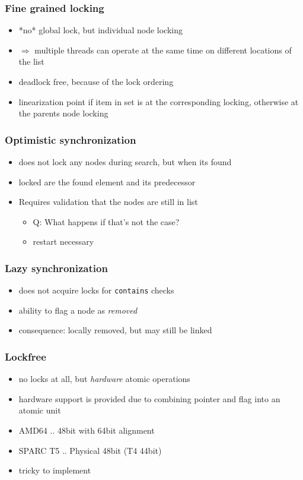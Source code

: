 \begin{frame}
\frametitle{Fine grained locking}
\begin{itemize}
	\item *no* global lock, but individual node locking
    \item \(\Rightarrow\) multiple threads can operate at the same time on different locations of the list
    \item deadlock free, because of the lock ordering
    \item linearization point if item in set is at the corresponding locking, otherwise at the parents node locking
\end{itemize}
\end{frame}

\begin{frame}
\frametitle{Optimistic synchronization}
\begin{itemize}
	\item does not lock any nodes during search, but when its found
    \item locked are the found element and its predecessor
    \item Requires validation that the nodes are still in list
    \begin{itemize}
		\item Q: What happens if that's not the case? 
        \item restart necessary 
	\end{itemize}
\end{itemize}
\end{frame}

\begin{frame}
\frametitle{Lazy synchronization}
\begin{itemize}
	\item does not acquire locks for \texttt{contains} checks
    \item ability to flag a node as \textit{removed}
    \item consequence: locally removed, but may still be linked
\end{itemize}
\end{frame}

\begin{frame}
\frametitle{Lockfree}
\begin{itemize}
	\item no locks at all, but \textit{hardware} atomic operations
    \item hardware support is provided due to combining pointer and flag into an atomic unit
    \item AMD64 .. 48bit with 64bit alignment
    \item SPARC T5 .. Physical 48bit (T4 44bit)
    \item tricky to implement
\end{itemize}
\end{frame}

